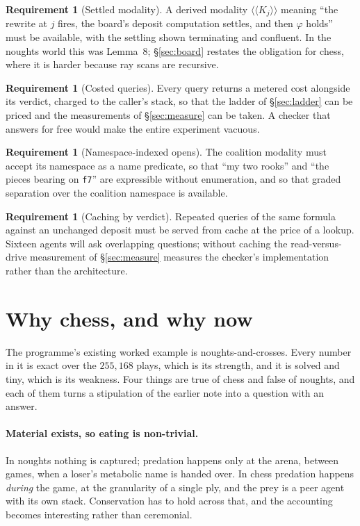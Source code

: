 \documentclass[11pt,a4paper]{article}
\theoremstyle{plain}
\theoremstyle{definition}
\newtheorem{requirement}[theorem]{Requirement}
\theoremstyle{remark}
\newcommand{\KKmod}[1]{\langle\!\langle K_{#1}\rangle\!\rangle}
\begin{document}
\begin{requirement}[Settled modality]
A derived modality $\KKmod{j}$ meaning ``the rewrite at $j$ fires, the board's
deposit computation settles, and then $\varphi$ holds'' must be available, with
the settling shown terminating and confluent. In the noughts world this was
Lemma~8; \S\ref{sec:board} restates the obligation for chess, where it is
harder because ray scans are recursive.
\end{requirement}

\begin{requirement}[Costed queries]
Every query returns a metered cost alongside its verdict, charged to the
caller's stack, so that the ladder of \S\ref{sec:ladder} can be priced and the
measurements of \S\ref{sec:measure} can be taken. A checker that answers for
free would make the entire experiment vacuous.
\end{requirement}

\begin{requirement}[Namespace-indexed opens]
The coalition modality must accept its namespace as a name predicate, so that
``my two rooks'' and ``the pieces bearing on \texttt{f7}'' are expressible
without enumeration, and so that graded separation over the coalition namespace
is available.
\end{requirement}

\begin{requirement}[Caching by verdict]
Repeated queries of the same formula against an unchanged deposit must be
served from cache at the price of a lookup. Sixteen agents will ask overlapping
questions; without caching the read-versus-drive measurement of
\S\ref{sec:measure} measures the checker's implementation rather than the
architecture.
\end{requirement}

\section{Why chess, and why now}
\label{sec:why}

The programme's existing worked example is noughts-and-crosses. Every number in
it is exact over the $255{,}168$ plays, which is its strength, and it is solved
and tiny, which is its weakness. Four things are true of chess and false of
noughts, and each of them turns a stipulation of the earlier note into a
question with an answer.

\paragraph{Material exists, so eating is non-trivial.} In noughts nothing is
captured; predation happens only at the arena, between games, when a loser's
metabolic name is handed over. In chess predation happens \emph{during} the
game, at the granularity of a single ply, and the prey is a peer agent with its
own stack. Conservation has to hold across that, and the accounting becomes
interesting rather than ceremonial.
\end{document}
